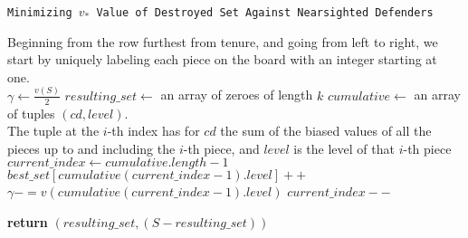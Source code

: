 \documentclass{article}
\theoremstyle{plain}
\theoremstyle{definition}
\theoremstyle{remark}
\begin{document}
\begin{center}
	\begin{minipage}{1\linewidth} %
		\begin{algorithm}[H]
			
			\caption{\texttt{Minimizing $v_{*}$ Value of Destroyed Set Against Nearsighted Defenders}} %
			\label{alg:farsighted}   %
			
			\medskip
			Beginning from the row furthest from tenure, and going from left to right, we start by uniquely labeling each piece on the board with an integer starting at one.\\
			\medskip
			$\gamma \leftarrow \frac{v(S)}{2}$\;
			$resulting\_set \leftarrow$ an array of zeroes of length $k$\;
			$cumulative \leftarrow$ an array of tuples $(cd, level)$. \\ The tuple at the $i$-th index has for $cd$ the sum of the biased values of all the pieces up to and including the $i$-th piece, and $level$ is the level of that $i$-th piece\;
			$current\_index \leftarrow cumulative.length - 1$\;
			\medskip
			 {
				 {
					$best\_set[cumulative(current\_index - 1).level]{+}{+}$\;
					$\gamma {-}{=} v(cumulative(current\_index - 1).level)$\;
				}
				$current\_index{-}{-}$\;
			}
			    
			\medskip
			{\bf return} $(resulting\_set, (S - resulting\_set))$\;
		\end{algorithm}
	\end{minipage}
\end{center}
\end{document}
